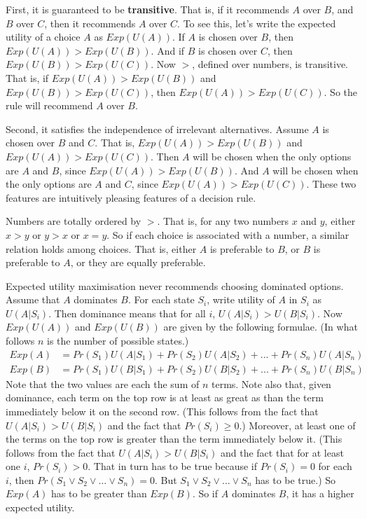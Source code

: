 First, it is guaranteed to be \textbf{transitive}. That is, if it recommends $A$ over $B$, and $B$ over $C$, then it recommends $A$ over $C$. To see this, let's write the expected utility of a choice $A$ as $Exp(U(A))$. If $A$ is chosen over $B$, then $Exp(U(A)) > Exp(U(B))$. And if $B$ is chosen over $C$, then $Exp(U(B)) > Exp(U(C))$. Now $>$, defined over numbers, is transitive. That is, if $Exp(U(A)) > Exp(U(B))$ and $Exp(U(B)) > Exp(U(C))$, then $Exp(U(A)) > Exp(U(C))$. So the rule will recommend $A$ over $B$.

Second, it satisfies the independence of irrelevant alternatives. Assume $A$ is chosen over $B$ and $C$. That is, $Exp(U(A)) > Exp(U(B))$ and $Exp(U(A)) > Exp(U(C))$. Then $A$ will be chosen when the only options are $A$ and $B$, since $Exp(U(A)) > Exp(U(B))$. And $A$ will be chosen when the only options are $A$ and $C$, since $Exp(U(A)) > Exp(U(C))$. These two features are intuitively pleasing features of a decision rule.

Numbers are totally ordered by $>$. That is, for any two numbers $x$ and $y$, either $x > y$ or $y > x$ or $x = y$. So if each choice is associated with a number, a similar relation holds among choices. That is, either $A$ is preferable to $B$, or $B$ is preferable to $A$, or they are equally preferable. 

Expected utility maximisation never recommends choosing dominated options. Assume that $A$ dominates $B$. For each state $S_i$, write utility of $A$ in $S_i$ as $U(A | S_i)$. Then dominance means that for all $i$, $U(A | S_i) > U(B | S_i)$. Now $Exp(U(A))$ and $Exp(U(B))$ are given by the following formulae. (In what follows $n$ is the number of possible states.)
\begin{align*}
Exp(A) &= Pr(S_1)U(A|S_1) + Pr(S_2)U(A|S_2) + ... + Pr(S_n)U(A | S_n) \\
Exp(B) &= Pr(S_1)U(B|S_1) + Pr(S_2)U(B|S_2) + ... + Pr(S_n)U(B | S_n)
\end{align*}
Note that the two values are each the sum of $n$ terms. Note also that, given dominance, each term on the top row is at least as great as than the term immediately below it on the second row. (This follows from the fact that $U(A | S_i) > U(B | S_i)$ and the fact that $Pr(S_i) \geq 0$.) Moreover, at least one of the terms on the top row is greater than the term immediately below it.  (This follows from the fact that $U(A | S_i) > U(B | S_i)$ and the fact that for at least one $i$, $Pr(S_i) > 0$. That in turn has to be true because if $Pr(S_i) = 0$ for each $i$, then $Pr(S_1 \vee S_2 \vee ... \vee S_n) = 0$. But $S_1 \vee S_2 \vee ... \vee S_n$ has to be true.) So $Exp(A)$ has to be greater than $Exp(B)$. So if $A$ dominates $B$, it has a higher expected utility.